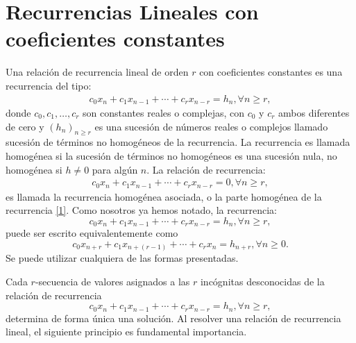 %
%
%	

\section{Recurrencias Lineales con coeficientes constantes}

Una relación de recurrencia lineal de orden $r$ con coeficientes constantes es una recurrencia del tipo:
\begin{align}\label{1}
c_{0}x_{n}+c_{1}x_{n-1}+\cdots+c_{r}x_{n-r}=h_{n},\forall n\geq r,
\end{align}
donde $c_{0},c_{1},\ldots,c_{r}$ son constantes reales o complejas, con $c_{0}$ y $c_{r}$ ambos diferentes de cero y $(h_{n})_{n\geq r}$ es una sucesión de números reales o complejos llamado sucesión de términos no homogéneos de la recurrencia. La recurrencia es llamada homogénea si la sucesión de términos no homogéneos es una sucesión nula, no homogénea si $h\neq0 $ para algún $n$. La relación de recurrencia:
\begin{align}\label{2}
c_{0}x_{n}+c_{1}x_{n-1}+\cdots+c_{r}x_{n-r}=0,\forall n\geq r,
\end{align}
es llamada la recurrencia homogénea asociada, o la parte homogénea de la recurrencia \eqref{1}. Como nosotros ya hemos notado, la recurrencia:
\begin{equation*}
c_{0}x_{n}+c_{1}x_{n-1}+\cdots+c_{r}x_{n-r}=h_{n},\forall n\geq r,
\end{equation*}
puede ser escrito equivalentemente como
\begin{equation*}
c_{0}x_{n+r}+c_{1}x_{n+(r-1)}+\cdots+c_{r}x_{n}=h_{n+r},\forall n\geq 0.
\end{equation*}
Se puede utilizar cualquiera de las formas presentadas.

\begin{remark}
	Cada $r$-secuencia de valores asignados a las $r$ incógnitas desconocidas de la relación de recurrencia
	\begin{equation*}
	c_{0}x_{n}+c_{1}x_{n-1}+\cdots+c_{r}x_{n-r}=h_{n},\forall n\geq r,
	\end{equation*}
	determina de forma única una solución. Al resolver una relación de recurrencia lineal, el siguiente principio es fundamental importancia.
\end{remark}


